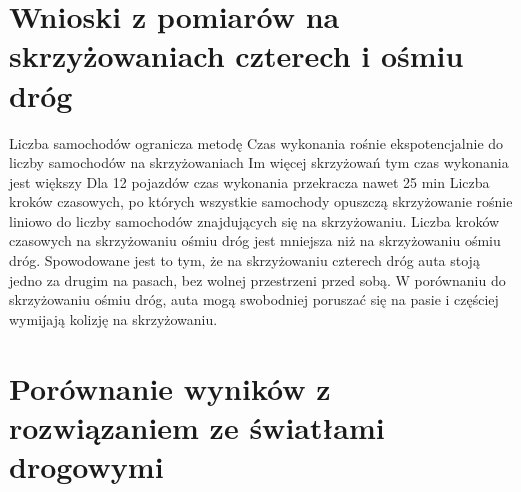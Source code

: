\section{Wnioski z pomiarów na skrzyżowaniach czterech i ośmiu dróg}

Liczba samochodów ogranicza metodę
\newline
\newline
Czas wykonania rośnie ekspotencjalnie do liczby samochodów na skrzyżowaniach
\newline
\newline
Im więcej skrzyżowań tym czas wykonania jest większy
\newline
\newline
Dla 12 pojazdów czas wykonania przekracza nawet 25 min
\newline
\newline
Liczba kroków czasowych, po których wszystkie samochody opuszczą skrzyżowanie rośnie liniowo do liczby samochodów znajdujących się na skrzyżowaniu.
\newline
\newline
Liczba kroków czasowych na skrzyżowaniu ośmiu dróg jest mniejsza niż na skrzyżowaniu ośmiu dróg. Spowodowane jest to tym, że na skrzyżowaniu czterech dróg auta stoją jedno za drugim na pasach, bez wolnej przestrzeni przed sobą. W porównaniu do skrzyżowaniu ośmiu dróg, auta mogą swobodniej poruszać się na pasie i częściej wymijają kolizję na skrzyżowaniu.

\section{Porównanie wyników z rozwiązaniem ze światłami drogowymi}

